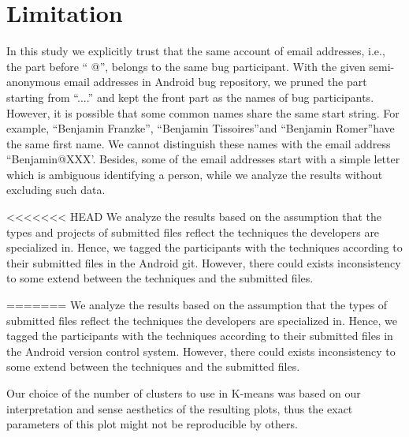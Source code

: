 \documentclass[conference]{IEEEtran}
\begin{document}
\section{Limitation}
\label{limitation}

In this study we explicitly trust that the same account of email
addresses, i.e., the part before \textquotedblleft
@\textquotedblright, belongs to the same bug participant. With the
given semi-anonymous email addresses in Android bug repository, we
pruned the part starting from \textquotedblleft ....\textquotedblright
and kept the front part as the names of bug participants. However, it
is possible that some common names share the same start string. For
example, \textquotedblleft Benjamin Franzke\textquotedblright,
\textquotedblleft Benjamin Tissoires\textquotedblright  and
\textquotedblleft Benjamin Romer\textquotedblright  have the same
first name. We cannot distinguish these names with the email address
\textquotedblleft Benjamin@XXX'. Besides, some of the email addresses
start with a simple letter which is ambiguous identifying a person,
while we analyze the results without excluding such data.


<<<<<<< HEAD
We analyze the results based on the assumption that the types and projects of
submitted files reflect the techniques the developers are specialized
in. Hence, we tagged the participants with the techniques according to
their submitted files in the Android git. However,
there could exists inconsistency to some extend between the techniques
and the submitted files.

=======
We analyze the results based on the assumption that the types of
submitted files reflect the techniques the developers are specialized
in. Hence, we tagged the participants with the techniques according to
their submitted files in the Android version control system. However,
there could exists inconsistency to some extend between the techniques
and the submitted files.

Our choice of the number of clusters to use in K-means was based on
our interpretation and sense aesthetics of the resulting plots, thus
the exact parameters of this plot might not be reproducible by others.
\end{document}
